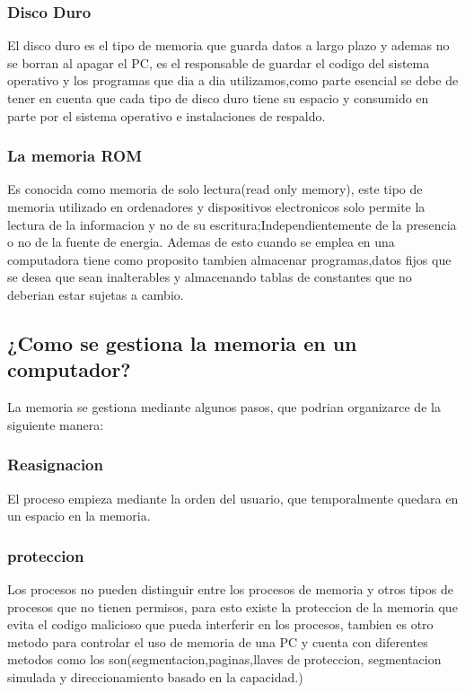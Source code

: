 \documentclass{article}
\begin{document}
        \subsubsection{Disco Duro}
        El disco duro es el tipo de memoria que guarda datos a largo plazo y ademas no se borran al apagar el PC, es el responsable de guardar el codigo del sistema operativo y los programas que dia a dia utilizamos,como parte esencial se debe de tener en cuenta que cada tipo de disco duro tiene su espacio y consumido en parte por el sistema operativo e instalaciones de respaldo.\cite{digitaltrends}
        
        \subsubsection{La memoria ROM}
        Es conocida como memoria de solo lectura(read only memory), este tipo de memoria utilizado en ordenadores y dispositivos electronicos solo permite la lectura de la informacion y no de su escritura;Independientemente  de la presencia o no de la fuente de energia. Ademas de esto  cuando se emplea en una computadora tiene como proposito tambien almacenar programas,datos fijos que se desea que sean inalterables y  almacenando tablas de constantes que no deberian estar sujetas a cambio.\cite{aca}
    
    \subsection{¿Como se gestiona la memoria en un computador?}
    La memoria se gestiona mediante algunos pasos, que podrian organizarce de la siguiente manera:
    
        \subsubsection{Reasignacion} El proceso empieza mediante la orden del usuario, que temporalmente quedara en un espacio en la memoria.\cite{wikipedia}
        
        \subsubsection{proteccion} Los procesos no pueden distinguir entre los procesos de memoria y otros tipos de procesos que no tienen permisos, para esto existe la proteccion de la memoria que evita el codigo malicioso que pueda interferir en los procesos, tambien es otro metodo para controlar el uso de memoria de una PC  y cuenta con diferentes metodos como los son(segmentacion,paginas,llaves de proteccion, segmentacion simulada y direccionamiento basado en la capacidad.)\cite{wiki}
        
\end{document}
